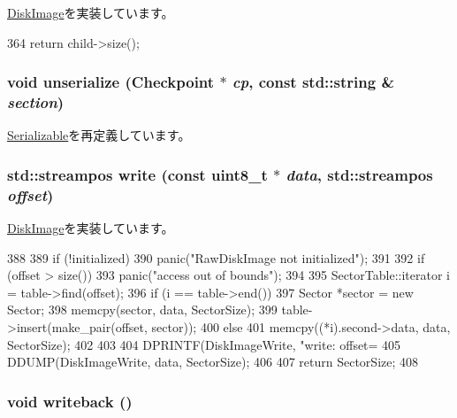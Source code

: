 \hyperlink{classDiskImage_a0e772d58951a6696fce770bd4c390e9f}{DiskImage}を実装しています。


\begin{DoxyCode}
364 { return child->size(); }
\end{DoxyCode}
\hypertarget{classCowDiskImage_af22e5d6d660b97db37003ac61ac4ee49}{
\subsubsection[{unserialize}]{\setlength{\rightskip}{0pt plus 5cm}void unserialize ({\bf Checkpoint} $\ast$ {\em cp}, \/  const std::string \& {\em section})}}
\label{classCowDiskImage_af22e5d6d660b97db37003ac61ac4ee49}


\hyperlink{classSerializable_af100c4e9feabf3cd918619c88c718387}{Serializable}を再定義しています。\hypertarget{classCowDiskImage_aadff68e91a6ca912a1878d79af3d0692}{
\subsubsection[{write}]{\setlength{\rightskip}{0pt plus 5cm}std::streampos write (const uint8\_\-t $\ast$ {\em data}, \/  std::streampos {\em offset})}}
\label{classCowDiskImage_aadff68e91a6ca912a1878d79af3d0692}


\hyperlink{classDiskImage_a42c90a80133a988d65ab33cc4d31d168}{DiskImage}を実装しています。


\begin{DoxyCode}
388 {
389     if (!initialized)
390         panic("RawDiskImage not initialized");
391 
392     if (offset > size())
393         panic("access out of bounds");
394 
395     SectorTable::iterator i = table->find(offset);
396     if (i == table->end()) {
397         Sector *sector = new Sector;
398         memcpy(sector, data, SectorSize);
399         table->insert(make_pair(offset, sector));
400     } else {
401         memcpy((*i).second->data, data, SectorSize);
402     }
403 
404     DPRINTF(DiskImageWrite, "write: offset=%
405     DDUMP(DiskImageWrite, data, SectorSize);
406 
407     return SectorSize;
408 }
\end{DoxyCode}
\hypertarget{classCowDiskImage_a9e578fb7567063e3ea37096c827e0412}{
\subsubsection[{writeback}]{\setlength{\rightskip}{0pt plus 5cm}void writeback ()}}
\label{classCowDiskImage_a9e578fb7567063e3ea37096c827e0412}



